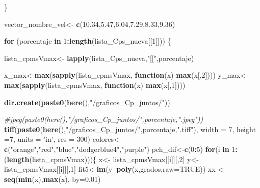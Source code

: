 \documentclass[]{article}
\newenvironment{Shaded}{\begin{snugshade}}{\end{snugshade}}
\newcommand{\KeywordTok}[1]{\textcolor[rgb]{0.13,0.29,0.53}{\textbf{#1}}}
\newcommand{\DataTypeTok}[1]{\textcolor[rgb]{0.13,0.29,0.53}{#1}}
\newcommand{\DecValTok}[1]{\textcolor[rgb]{0.00,0.00,0.81}{#1}}
\newcommand{\FloatTok}[1]{\textcolor[rgb]{0.00,0.00,0.81}{#1}}
\newcommand{\StringTok}[1]{\textcolor[rgb]{0.31,0.60,0.02}{#1}}
\newcommand{\CommentTok}[1]{\textcolor[rgb]{0.56,0.35,0.01}{\textit{#1}}}
\newcommand{\OtherTok}[1]{\textcolor[rgb]{0.56,0.35,0.01}{#1}}
\newcommand{\ControlFlowTok}[1]{\textcolor[rgb]{0.13,0.29,0.53}{\textbf{#1}}}
\newcommand{\OperatorTok}[1]{\textcolor[rgb]{0.81,0.36,0.00}{\textbf{#1}}}
\newcommand{\NormalTok}[1]{#1}
\begin{document}
\begin{Shaded}
\begin{Highlighting}[]
{{{{{{{{{{{{\NormalTok{  \} }
  
\NormalTok{  vector_nombre_vel<-}\StringTok{ }\KeywordTok{c}\NormalTok{(}\FloatTok{10.34}\NormalTok{,}\FloatTok{5.47}\NormalTok{,}\FloatTok{6.04}\NormalTok{,}\FloatTok{7.29}\NormalTok{,}\FloatTok{8.33}\NormalTok{,}\FloatTok{9.36}\NormalTok{)}
  
  
  \ControlFlowTok{for}\NormalTok{ (porcentaje }\ControlFlowTok{in} \DecValTok{1}\OperatorTok{:}\KeywordTok{length}\NormalTok{(lista_Cps_nueva[[}\DecValTok{1}\NormalTok{]])) \{}
    
\NormalTok{    lista_cpmsVmax<-}\StringTok{ }\KeywordTok{lapply}\NormalTok{(lista_Cps_nueva,}\StringTok{"[["}\NormalTok{,porcentaje)}
    
\NormalTok{    x_max<-}\KeywordTok{max}\NormalTok{(}\KeywordTok{sapply}\NormalTok{(lista_cpmsVmax, }\ControlFlowTok{function}\NormalTok{(x) }\KeywordTok{max}\NormalTok{(x[,}\DecValTok{2}\NormalTok{])))}
\NormalTok{    y_max<-}\KeywordTok{max}\NormalTok{(}\KeywordTok{sapply}\NormalTok{(lista_cpmsVmax, }\ControlFlowTok{function}\NormalTok{(x) }\KeywordTok{max}\NormalTok{(x[,}\DecValTok{1}\NormalTok{])))}
    
    
    \KeywordTok{dir.create}\NormalTok{(}\KeywordTok{paste0}\NormalTok{(}\KeywordTok{here}\NormalTok{(),}\StringTok{"/graficos_Cp_juntos/"}\NormalTok{))}
    
    \CommentTok{#jpeg(paste0(here(),"/graficos_Cp_juntos/",porcentaje,".jpeg"))}
    \KeywordTok{tiff}\NormalTok{(}\KeywordTok{paste0}\NormalTok{(}\KeywordTok{here}\NormalTok{(),}\StringTok{"/graficos_Cp_juntos/"}\NormalTok{,porcentaje,}\StringTok{".tiff"}\NormalTok{), }\DataTypeTok{width =} \DecValTok{7}\NormalTok{, }\DataTypeTok{height =}\DecValTok{7}\NormalTok{, }\DataTypeTok{units =} \StringTok{'in'}\NormalTok{, }\DataTypeTok{res =} \DecValTok{300}\NormalTok{)}
\NormalTok{    colores<-}\StringTok{ }\KeywordTok{c}\NormalTok{(}\StringTok{"orange"}\NormalTok{,}\StringTok{"red"}\NormalTok{,}\StringTok{"blue"}\NormalTok{,}\StringTok{"dodgerblue4"}\NormalTok{,}\StringTok{"purple"}\NormalTok{)}
\NormalTok{    pch_dif<-}\KeywordTok{c}\NormalTok{(}\DecValTok{0}\OperatorTok{:}\DecValTok{5}\NormalTok{)}
    \ControlFlowTok{for}\NormalTok{(i }\ControlFlowTok{in} \DecValTok{1}\OperatorTok{:}\NormalTok{(}\KeywordTok{length}\NormalTok{(lista_cpmsVmax)))\{}
\NormalTok{      x<-}\StringTok{ }\NormalTok{lista_cpmsVmax[[i]][,}\DecValTok{2}\NormalTok{]}
\NormalTok{      y<-}\StringTok{ }\NormalTok{lista_cpmsVmax[[i]][,}\DecValTok{1}\NormalTok{]}
\NormalTok{      fit5<-}\KeywordTok{lm}\NormalTok{(y}\OperatorTok{~}\KeywordTok{poly}\NormalTok{(x,grados,}\DataTypeTok{raw=}\OtherTok{TRUE}\NormalTok{))}
\NormalTok{      xx <-}\StringTok{ }\KeywordTok{seq}\NormalTok{(}\KeywordTok{min}\NormalTok{(x),}\KeywordTok{max}\NormalTok{(x), }\DataTypeTok{by=}\FloatTok{0.01}\NormalTok{)}
      
}}}}}}}}}}}}
\end{Highlighting}
\end{Shaded}
\end{document}
